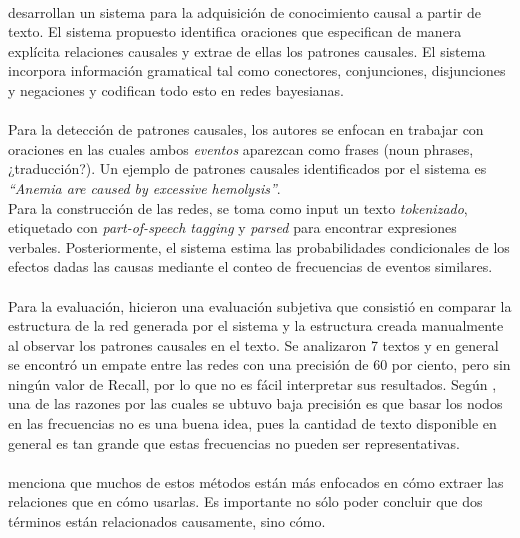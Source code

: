 \documentclass[11pt]{article}
\theoremstyle{plain}
\begin{document}
\\
\cite{sanchez2004acquiring} desarrollan un sistema para la adquisición de conocimiento causal a partir de texto. El sistema propuesto identifica oraciones que especifican de manera explícita relaciones causales y extrae de ellas los patrones causales. El sistema incorpora información gramatical tal como conectores, conjunciones, disjunciones y negaciones y codifican todo esto en redes bayesianas.\\
\\
Para la detección de patrones causales, los autores se enfocan en trabajar con oraciones en las cuales ambos \textit{eventos} aparezcan como frases (noun phrases, ¿traducción?). Un ejemplo de patrones causales identificados por el sistema es \textit{“Anemia are caused by excessive hemolysis”}.
\\
Para la construcción de las redes, se toma como input un texto \textit{tokenizado}, etiquetado con \textit{part-of-speech tagging} y \textit{parsed} para encontrar expresiones verbales. Posteriormente, el sistema estima las probabilidades condicionales de los efectos dadas las causas mediante el conteo de frecuencias de eventos similares.\\
\\
Para la evaluación, hicieron una evaluación subjetiva que consistió en comparar la estructura de la red generada por el sistema y la estructura creada manualmente al observar los patrones causales en el texto. Se analizaron 7 textos y en general se encontró un empate entre las redes con una precisión de 60 por ciento, pero sin ningún valor de Recall, por lo que no es fácil interpretar sus resultados. Según \cite{bojduj2009extraction}, una de las razones por las cuales se ubtuvo baja precisión es que basar los nodos en las frecuencias no es una buena idea, pues la cantidad de texto disponible en general es tan grande que estas frecuencias no pueden ser representativas.\\
\\
\cite{bojduj2009extraction} menciona que muchos de estos métodos están más enfocados en cómo extraer las relaciones que en cómo usarlas. Es importante no sólo poder concluir que dos términos están relacionados causamente, sino cómo.
\end{document}
